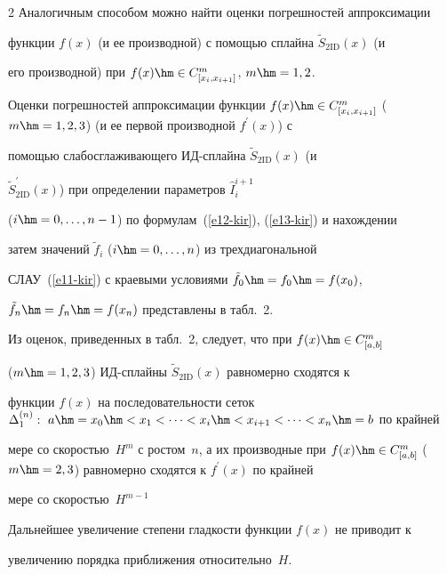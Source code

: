 \begin{multicols}{2}
  Аналогичным способом можно найти оценки погрешностей аппроксимации 


функции $f(x)$ (и ее производной) с помощью сплайна $\tilde{S}_{2\mathrm{ID}}(x)$ (и 


его производной) при $f(x)\hm\in C^m_{[x_i,x_{i+1}]}$, $m\hm=1,2$.


  


  Оценки погрешностей аппроксимации функции $f(x)\hm \in 


C^m_{[x_i,x_{i+1}]}$ ($m\hm=1,2,3$) (и ее первой производной $f^\prime(x)$) с 


помощью слабо\-сгла\-жи\-ва\-юще\-го ИД-сплай\-на $\tilde{S}_{2\mathrm{ID}}(x)$ (и 


$\tilde{S}^\prime_{2\mathrm{ID}}(x)$) при определении параметров $\hat{I}_i^{i+1}$ 


($i\hm=0, \ldots , n-1$) по формулам~(\ref{e12-kir}), (\ref{e13-kir}) и нахождении 


затем значений $\tilde{f}_i$ ($i\hm=0, \ldots ,n$) из трехдиагональной 


СЛАУ~(\ref{e11-kir}) с краевыми условиями $\tilde{f}_0\hm= f_0\hm= f(x_0)$, 


$\tilde{f}_n \hm= f_n \hm= f(x_n)$ представлены в табл.~2.


  








  


  Из оценок, приведенных в табл.~2, следует, что при $f(x)\hm\in C^m_{[a,b]}$ 


($m\hm=1,2,3$) ИД-сплай\-ны $\tilde{S}_{2\mathrm{ID}}(x)$ равномерно сходятся к 


функции $f(x)$ на последовательности сеток $\Delta_1^{(n)}:\ 


a\hm=x_0\hm<x_1<\cdots < x_i \hm< x_{i+1}<\cdots < x_n\hm=b$ по крайней 


мере со ско\-ростью~$H^m$ с ростом~$n$, а их производные при $f(x)\hm\in 


C^m_{[a,b]}$ ($m\hm=2,3$) равномерно сходятся к $f^\prime(x)$ по крайней 


мере со скоростью~$H^{m-1}$


  


  Дальнейшее увеличение степени гладкости функции $f(x)$ не приводит к 


увеличению порядка приближения относительно~$H$.






\end{multicols}
